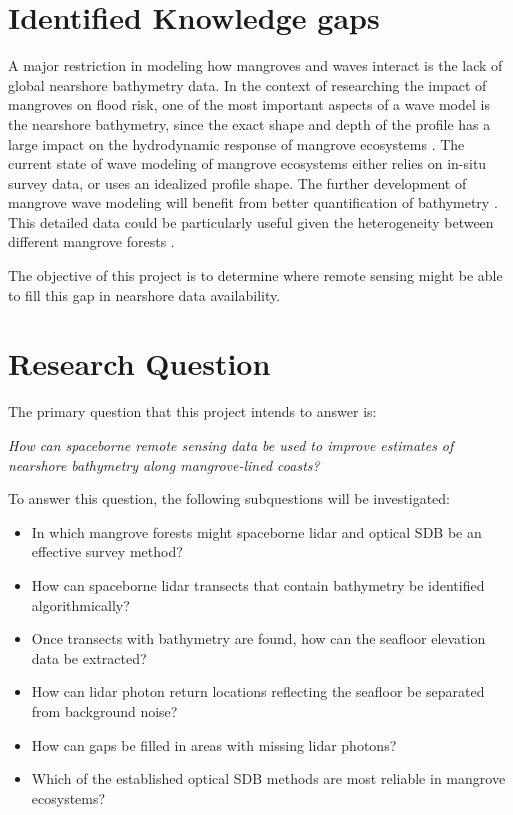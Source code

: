 \section{Identified Knowledge gaps}

A major restriction in modeling how mangroves and waves interact is the lack of global nearshore bathymetry data. In the context of researching the impact of mangroves on flood risk, one of the most important aspects of a wave model is the nearshore bathymetry, since the exact shape and depth of the profile has a large impact on the hydrodynamic response of mangrove ecosystems \parencite{Horstman2014,Maza2019}. The current state of wave modeling of mangrove ecosystems either relies on in-situ survey data, or uses an idealized profile shape. The further development of mangrove wave modeling will benefit from better quantification of bathymetry \parencite{Menendez2020,GijonMancheno2021}. This detailed data could be particularly useful given the heterogeneity between different mangrove forests \parencite{Mazda2013}.

The objective of this project is to determine where remote sensing might be able to fill this gap in nearshore data availability.

\section{Research Question}
The primary question that this project intends to answer is:

\emph{How can spaceborne remote sensing data be used to improve estimates of nearshore bathymetry along mangrove-lined coasts?}

To answer this question, the following subquestions will be investigated:

\begin{itemize}
      \item In which mangrove forests might spaceborne lidar and optical SDB be an effective survey method?
      \item How can spaceborne lidar transects that contain bathymetry be identified algorithmically?
      \item Once transects with bathymetry are found, how can the seafloor elevation data be extracted?
      \item How can lidar photon return locations reflecting the seafloor be separated from background noise?
      \item How can gaps be filled in areas with missing lidar photons?
      \item Which of the established optical SDB methods are most reliable in mangrove ecosystems?
\end{itemize}
